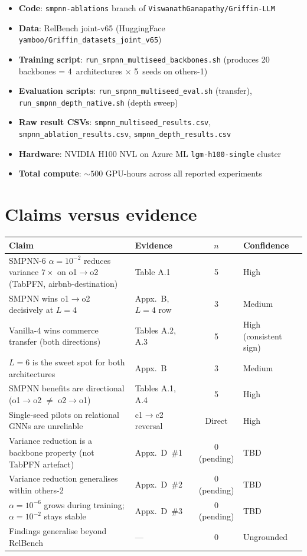 \documentclass{article}
\begin{document}
\begin{itemize}
  \item \textbf{Code}: \verb|smpnn-ablations| branch of \verb|ViswanathGanapathy/Griffin-LLM|
  \item \textbf{Data}: RelBench joint-v65 (HuggingFace \verb|yamboo/Griffin_datasets_joint_v65|)
  \item \textbf{Training script}: \verb|run_smpnn_multiseed_backbones.sh| (produces 20 backbones = 4~architectures $\times$ 5~seeds on others-1)
  \item \textbf{Evaluation scripts}: \verb|run_smpnn_multiseed_eval.sh| (transfer), \verb|run_smpnn_depth_native.sh| (depth sweep)
  \item \textbf{Raw result CSVs}: \verb|smpnn_multiseed_results.csv|, \verb|smpnn_ablation_results.csv|, \verb|smpnn_depth_results.csv|
  \item \textbf{Hardware}: NVIDIA H100 NVL on Azure ML \verb|lgm-h100-single| cluster
  \item \textbf{Total compute}: ${\sim}500$ GPU-hours across all reported experiments
\end{itemize}

\section{Claims versus evidence}
\label{app:claims}

\begin{table}[h]
  \centering
  \small
  \begin{tabular}{@{}L{6.8cm}L{2.2cm}cl@{}}
    \toprule
    Claim & Evidence & $n$ & Confidence \\
    \midrule
    SMPNN-6 $\alpha{=}10^{-2}$ reduces variance $7\times$ on o1$\to$o2 (TabPFN, airbnb-destination) & Table A.1 & 5 & High \\
    SMPNN wins o1$\to$o2 decisively at $L{=}4$ & Appx.~B, $L{=}4$ row & 3 & Medium \\
    Vanilla-4 wins commerce transfer (both directions) & Tables A.2, A.3 & 5 & High (consistent sign) \\
    $L{=}6$ is the sweet spot for both architectures & Appx.~B & 3 & Medium \\
    SMPNN benefits are directional (o1$\to$o2 $\ne$ o2$\to$o1) & Tables A.1, A.4 & 5 & High \\
    Single-seed pilots on relational GNNs are unreliable & c1$\to$c2 reversal & Direct & High \\
    Variance reduction is a backbone property (not TabPFN artefact) & Appx.~D~\#1 & 0 (pending) & TBD \\
    Variance reduction generalises within others-2 & Appx.~D~\#2 & 0 (pending) & TBD \\
    $\alpha{=}10^{-6}$ grows during training; $\alpha{=}10^{-2}$ stays stable & Appx.~D~\#3 & 0 (pending) & TBD \\
    Findings generalise beyond RelBench & --- & 0 & Ungrounded \\
    \bottomrule
  \end{tabular}
\end{table}
\end{document}
